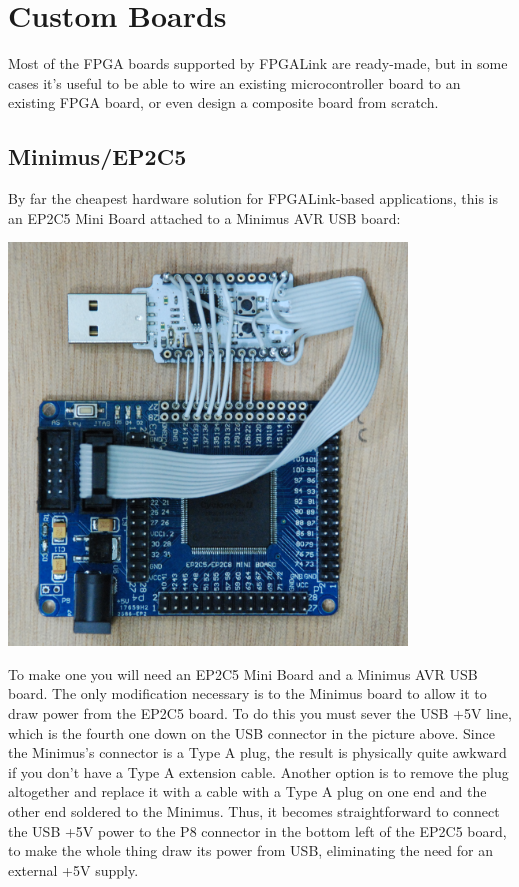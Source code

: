 \appendix
\newpage
\section{Custom Boards}
\label{apdx:custom}

Most of the FPGA boards supported by FPGALink are ready-made, but in some cases it's useful to be able to wire an existing microcontroller board to an existing FPGA board, or even design a composite board from scratch.

\subsection{Minimus/EP2C5}
By far the cheapest hardware solution for FPGALink-based applications, this is an EP2C5 Mini Board attached to a Minimus AVR USB board:

\vspace*{0.5cm}
\centerline{\includegraphics[width=300pt]{images/ep2c5}}

To make one you will need an EP2C5 Mini Board and a Minimus AVR USB board. The only modification necessary is to the Minimus board to allow it to draw power from the EP2C5 board. To do this you must sever the USB +5V line, which is the fourth one down on the USB connector in the picture above. Since the Minimus's connector is a Type A plug, the result is physically quite awkward if you don't have a Type A extension cable. Another option is to remove the plug altogether and replace it with a cable with a Type A plug on one end and the other end soldered to the Minimus. Thus, it becomes straightforward to connect the USB +5V power to the P8 connector in the bottom left of the EP2C5 board, to make the whole thing draw its power from USB, eliminating the need for an external +5V supply.

